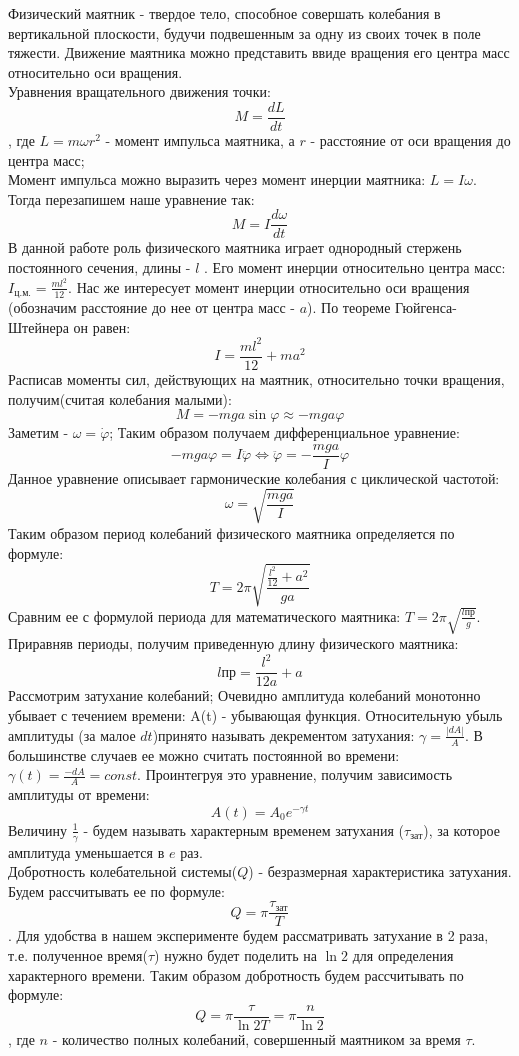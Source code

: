 \documentclass[a4paper,14pt]{extarticle}
\begin{document}
    Физический маятник - твердое тело, способное совершать колебания в вертикальной плоскости, будучи подвешенным за одну из своих точек в поле тяжести.
    Движение маятника можно представить ввиде вращения его центра масс относительно оси вращения.\\ Уравнения вращательного движения точки: $$M = \frac{dL}{dt}$$, где $L = m\omega r^2$ - момент импульса маятника, а $r$ - расстояние от оси вращения до центра масс;\\
    Момент импульса можно выразить через момент инерции маятника: $L = I\omega$. Тогда перезапишем наше уравнение так:
    $$M = I\frac{d\omega}{dt}$$
    В данной работе роль физического маятника играет однородный стержень постоянного сечения, длины - $l$ . Его момент инерции относительно центра масс: $I_\text{ц.м.} = \frac{ml^2}{12}$. Нас же интересует момент инерции относительно оси вращения (обозначим расстояние до нее от центра масс - $a$). По теореме Гюйгенса-Штейнера он равен: $$I  = \frac{ml^2}{12} + ma^2$$
    Расписав моменты сил, действующих на маятник, относительно точки вращения, получим(считая колебания малыми):
	$$M = -mga\sin \varphi \approx -mga\varphi$$ 
	Заметим - $\omega = \dot{\varphi}$; Таким образом получаем дифференциальное уравнение:
	$$-mga\varphi = I\ddot{\varphi} \Leftrightarrow \ddot{\varphi} = -\frac{mga}{I}\varphi$$
	Данное уравнение описывает гармонические колебания с циклической частотой: $$\omega = \sqrt{\frac{mga}{I}}$$
	Таким образом период колебаний физического маятника определяется по формуле:
	$$T = 2\pi \sqrt{\frac{\frac{l^2}{12} + a^2}{ga}}$$
	Сравним ее с формулой периода для математического маятника: $T = 2\pi \sqrt{\frac{l\text{пр}}{g}}$.
	Приравняв периоды, получим приведенную длину физического маятника:
	$$l\text{пр} = \frac{l^2}{12a} + a$$
	Рассмотрим затухание колебаний; Очевидно амплитуда колебаний монотонно убывает с течением времени: A(t) - убывающая функция. Относительную убыль амплитуды (за малое $dt$)принято называть декрементом затухания: $\gamma = \frac{|{dA}|}{A}$. В большинстве случаев ее можно считать постоянной во времени: $\gamma(t) = \frac{-{dA}}{A} = const$. Проинтегруя это уравнение, получим зависимость амплитуды от времени:$$A(t) = A_0 e^{-\gamma t}$$
	Величину $\frac{1}{\gamma}$ - будем называть характерным временем затухания ($\tau_\text{зат}$), за которое амплитуда уменьшается в $e$ раз.\\    
	Добротность колебательной системы($Q$) - безразмерная характеристика затухания. Будем рассчитывать ее по формуле: $$Q = \pi \frac{\tau_\text{зат}}{T} $$. Для удобства в нашем эксперименте будем рассматривать затухание в 2 раза, т.е. полученное время($\tau$) нужно будет поделить на $\ln{2}$ для определения характерного времени. Таким образом добротность будем рассчитывать по формуле: $$Q = \pi \frac{\tau}{\ln{2} T} = \pi \frac{n}{\ln{2}}$$, где $n$ - количество полных колебаний, совершенный маятником за время $\tau$.
\end{document}
